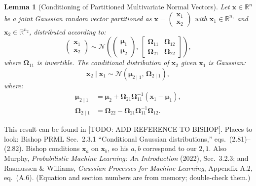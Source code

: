 \documentclass{article}
\newtheorem{lemma}{Lemma}
\begin{document}
\begin{lemma}[Conditioning of Partitioned Multivariate Normal Vectors]
\label{lem:mvn_conditioning}
Let $\mathbf{x} \in \mathbb{R}^n$ be a joint Gaussian random vector partitioned as $\mathbf{x} = \begin{pmatrix} \mathbf{x}_1 \\ \mathbf{x}_2 \end{pmatrix}$ with $\mathbf{x}_1 \in \mathbb{R}^{n_1}$ and $\mathbf{x}_2 \in \mathbb{R}^{n_2}$, distributed according to:
\begin{equation}
    \begin{pmatrix} \mathbf{x}_1 \\ \mathbf{x}_2 \end{pmatrix} \sim \mathcal{N}\left( \begin{pmatrix} \boldsymbol{\mu}_1 \\ \boldsymbol{\mu}_2 \end{pmatrix}, \, \begin{bmatrix} \boldsymbol{\Omega}_{11} & \boldsymbol{\Omega}_{12} \\ \boldsymbol{\Omega}_{21} & \boldsymbol{\Omega}_{22} \end{bmatrix} \right),
\end{equation}
where $\boldsymbol{\Omega}_{11}$ is invertible. The conditional distribution of $\mathbf{x}_2$ given $\mathbf{x}_1$ is Gaussian:
\begin{equation}
    \mathbf{x}_2 \mid \mathbf{x}_1 \sim \mathcal{N}(\boldsymbol{\mu}_{2 \mid 1}, \, \boldsymbol{\Omega}_{2 \mid 1}),
\end{equation}
where:
\begin{align}
    \boldsymbol{\mu}_{2 \mid 1} &= \boldsymbol{\mu}_2 + \boldsymbol{\Omega}_{21} \boldsymbol{\Omega}_{11}^{-1} (\mathbf{x}_1 - \boldsymbol{\mu}_1), \\
    \boldsymbol{\Omega}_{2 \mid 1} &= \boldsymbol{\Omega}_{22} - \boldsymbol{\Omega}_{21} \boldsymbol{\Omega}_{11}^{-1} \boldsymbol{\Omega}_{12}.
\end{align}
\end{lemma}
This result can be found in [TODO: ADD REFERENCE TO BISHOP]. Places to look: Bishop PRML Sec.~2.3.1 ``Conditional Gaussian distributions,'' eqs.~(2.81)--(2.82). Bishop conditions $\mathbf{x}_a$ on $\mathbf{x}_b$, so his $a,b$ correspond to our $2,1$. Also Murphy, \emph{Probabilistic Machine Learning: An Introduction} (2022), Sec.~3.2.3; and Rasmussen \& Williams, \emph{Gaussian Processes for Machine Learning}, Appendix A.2, eq.~(A.6). (Equation and section numbers are from memory; double-check them.)
\end{document}
